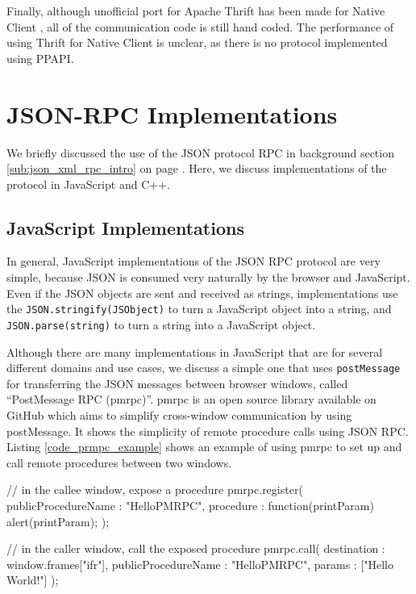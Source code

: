 Finally, although unofficial port for Apache Thrift has been made for Native Client \cite{thriftnacl}, all of the communication code is still hand coded. The performance of using Thrift for Native Client is unclear, as there is no protocol implemented using PPAPI.





\section{JSON-RPC Implementations} %
We briefly discussed the use of the JSON protocol RPC in background section \ref{sub:json_xml_rpc_intro} on page \pageref{sub:json_xml_rpc_intro}. Here, we discuss implementations of the protocol in JavaScript and C++.
\label{sec:json_rpc_implementations}


\subsection{JavaScript Implementations} %
\label{sub:pmrpc_json_rpc_using_postmessage}

In general, JavaScript implementations of the JSON RPC protocol are very simple, because JSON is consumed very naturally by the browser and JavaScript. Even if the JSON objects are sent and received as strings, implementations use the \lstinline{JSON.stringify(JSObject)} to turn a JavaScript object into a string, and \lstinline{JSON.parse(string)} to turn a string into a JavaScript object.

Although there are many implementations in JavaScript that are for several different domains and use cases, we discuss a simple one that uses \lstinline{postMessage} for transferring the JSON messages between browser windows, called ``PostMessage RPC (pmrpc)''. pmrpc is an open source library available on GitHub \cite{pmrpc} which aims to simplify cross-window communication by using postMessage. It shows the simplicity of remote procedure calls using JSON RPC. Listing \ref{code_prmpc_example} shows an example of using pmrpc to set up and call remote procedures between two windows.

\begin{code}
// in the callee window, expose a procedure
pmrpc.register({
  publicProcedureName : "HelloPMRPC",
  procedure : function(printParam) { alert(printParam); } 
});

// in the caller window, call the exposed procedure
pmrpc.call({
  destination : window.frames["ifr"],
  publicProcedureName : "HelloPMRPC",
  params : ["Hello World!"]
});
\end{code}

